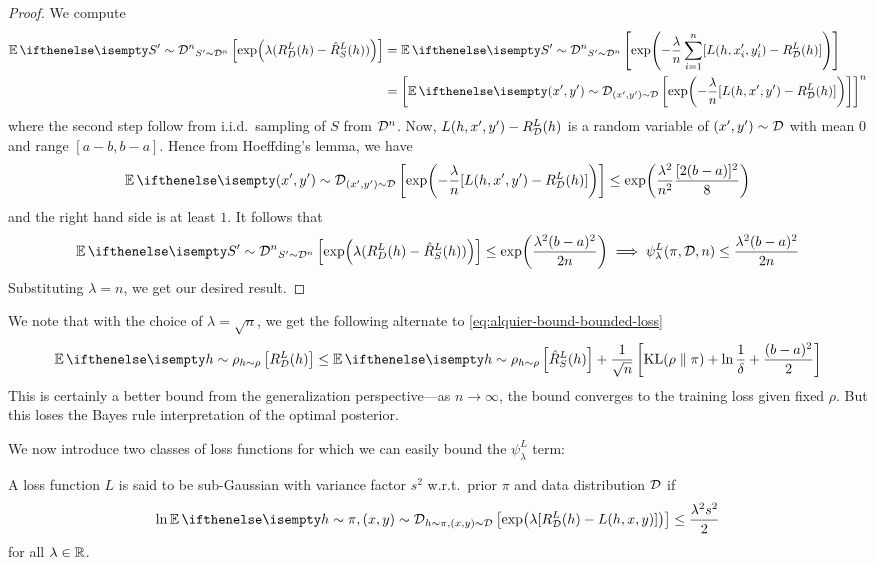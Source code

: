\begin{proof}
  We compute
  \begin{equation}
    \begin{split}
      \Ev[S' \sim \CD^n]{\exp(\lambda (R_D^L(h) - \hat{R}_S^L(h)))}
      &= \Ev[S' \sim \CD^n]{\exp(-\frac{\lambda}{n} \sum_{i = 1}^n [L(h, x_i',
      y_i') - R_\CD^L(h)])} \\
      &= \left[\Ev[(x', y') \sim \CD]{\exp(-\frac{\lambda}{n} [L(h, x', y') -
      R_\CD^L(h)])}\right]^n
    \end{split}
  \end{equation}
  where the second step follow from i.i.d.\ sampling of $S$ from $\mathcal{D}^n$. Now,
  $L(h, x', y') - R_{\mathcal{D}}^L(h)$ is a random variable of $(x', y') \sim \mathcal{D}$ with
  mean $0$ and range $[a - b, b - a]$. Hence from Hoeffding's lemma, we have
  \begin{equation}
    \Ev[(x', y') \sim \CD]{\exp(-\frac{\lambda}{n} [L(h, x', y') - R_\CD^L(h)])}
    \leq \exp(\frac{\lambda^2}{n^2} \frac{[2 (b - a)]^2}{8})
  \end{equation}
  and the right hand side is at least $1$. It follows that
  \begin{equation}
    \Ev[S' \sim \CD^n]{\exp(\lambda (R_D^L(h) - \hat{R}_S^L(h)))} \leq
    \exp(\frac{\lambda^2 (b - a)^2}{2n}) \implies \psi_\lambda^L(\pi, \CD, n)
    \leq \frac{\lambda^2 (b - a)^2}{2 n}
  \end{equation}
  Substituting $\lambda = n$, we get our desired result.
\end{proof}

We note that with the choice of $\lambda = \sqrt{n}$, we get the following
alternate to \eqref{eq:alquier-bound-bounded-loss}
\begin{equation}
  \Ev[h \sim \rho]{R_\CD^L(h)} \leq \Ev[h \sim \rho]{\hat{R}_S^L(h)} +
  \frac{1}{\sqrt{n}}\left[\KL{\rho}{\pi} + \ln \frac{1}{\delta} + \frac{(b -
  a)^2}{2}\right]
\end{equation}
This is certainly a better bound from the generalization perspective---as $n \to
\infty$, the bound converges to the training loss given fixed $\rho$. But this
loses the Bayes rule interpretation of the optimal posterior.

We now introduce two classes of loss functions for which we can easily bound the
$\psi_\lambda^L$ term:

\begin{definition}
  A loss function $L$ is said to be sub-Gaussian with variance factor $s^2$
  w.r.t.\ prior $\pi$ and data distribution $\mathcal{D}$ if
  \begin{equation}
    \ln \Ev[h \sim \pi, (x, y) \sim \CD]{\exp(\lambda [R_\CD^L(h) - L(h, x,
    y)])} \leq \frac{\lambda^2 s^2}{2}
  \end{equation}
  for all $\lambda \in \mathbb{R}$.
\end{definition}

